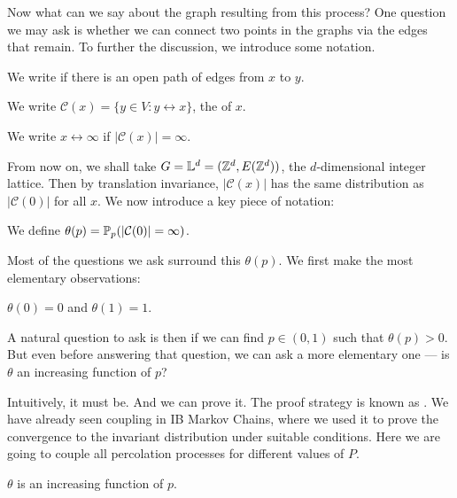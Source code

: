 \documentclass[a4paper]{article}
\renewcommand\L{\mathbb{L}}
\begin{document}
Now what can we say about the graph resulting from this process? One question we may ask is whether we can connect two points in the graphs via the edges that remain. To further the discussion, we introduce some notation.

\begin{notation}
  We write  if there is an open path of edges from $x$ to $y$.
\end{notation}

\begin{notation}
  We write $\mathcal{C}(x) = \{y \in V: y \leftrightarrow x\}$, the  of $x$.
\end{notation}

\begin{notation}
  We write $x \leftrightarrow \infty$ if $|\mathcal{C}(x)| = \infty$.
\end{notation}

From now on, we shall take $G = \L^d = (\Z^d, E(\Z^d))$, the $d$-dimensional integer lattice.\index{$\L^d$} Then by translation invariance, $|\mathcal{C}(x)|$ has the same distribution as $|\mathcal{C}(0)|$ for all $x$. We now introduce a key piece of notation:
\begin{defi}[$\theta(p)$]
  We define $\theta(p) = \P_p(|\mathcal{C}(0)| = \infty)$.
\end{defi}

Most of the questions we ask surround this $\theta(p)$. We first make the most elementary observations:
\begin{eg}
  $\theta(0) = 0$ and $\theta(1) = 1$.
\end{eg}

A natural question to ask is then if we can find $p \in (0, 1)$ such that $\theta(p) > 0$. But even before answering that question, we can ask a more elementary one --- is $\theta$ an increasing function of $p$?

Intuitively, it must be. And we can prove it. The proof strategy is known as . We have already seen coupling in IB Markov Chains, where we used it to prove the convergence to the invariant distribution under suitable conditions. Here we are going to couple all percolation processes for different values of $P$.

\begin{lemma}
  $\theta$ is an increasing function of $p$.
\end{lemma}
\end{document}

